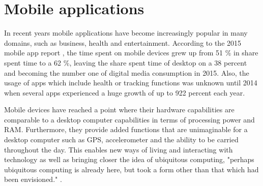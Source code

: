 \section{Mobile applications}
In recent years mobile applications have become increasingly popular in many domains, such as business, health and entertainment. According to the 2015 mobile app report \cite{ComScore}, the time spent on mobile devices grew up from 51 \% in share spent time to a 62 \%, leaving the share spent time of desktop on a 38 percent and becoming the number one of digital media consumption in 2015. Also, the usage of apps which include health or tracking functions was unknown until 2014 when several apps experienced a huge growth of up to 922 percent each year\cite{ComScore}. 

Mobile devices have reached a point where their hardware capabilities are comparable to a desktop computer capabilities in terms of processing power and RAM. Furthermore, they provide added functions that are unimaginable for a desktop computer such as GPS, accelerometer and the ability to be carried throughout the day. This enables new ways of living and interacting with technology as well as bringing closer the idea of ubiquitous computing, "perhaps ubiquitous computing is already here, but took a form other than that which had been envisioned." \cite{Bell2007}. 

